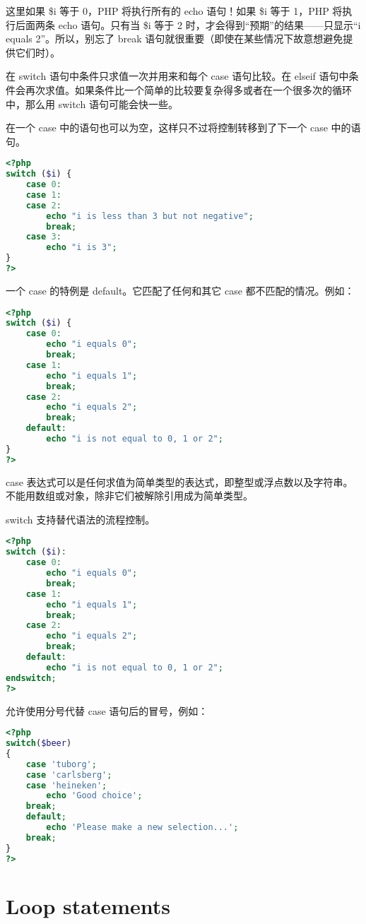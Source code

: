 这里如果 \$i 等于 0，PHP 将执行所有的 echo 语句！如果 \$i 等于 1，PHP 将执行后面两条 echo 语句。只有当 \$i 等于 2 时，才会得到“预期”的结果——只显示“i equals 2”。所以，别忘了 break 语句就很重要（即使在某些情况下故意想避免提供它们时）。

在 switch 语句中条件只求值一次并用来和每个 case 语句比较。在 elseif 语句中条件会再次求值。如果条件比一个简单的比较要复杂得多或者在一个很多次的循环中，那么用 switch 语句可能会快一些。

在一个 case 中的语句也可以为空，这样只不过将控制转移到了下一个 case 中的语句。

\begin{lstlisting}[language=PHP]
<?php
switch ($i) {
    case 0:
    case 1:
    case 2:
        echo "i is less than 3 but not negative";
        break;
    case 3:
        echo "i is 3";
}
?>
\end{lstlisting}


一个 case 的特例是 default。它匹配了任何和其它 case 都不匹配的情况。例如：

\begin{lstlisting}[language=PHP]
<?php
switch ($i) {
    case 0:
        echo "i equals 0";
        break;
    case 1:
        echo "i equals 1";
        break;
    case 2:
        echo "i equals 2";
        break;
    default:
        echo "i is not equal to 0, 1 or 2";
}
?>
\end{lstlisting}


case 表达式可以是任何求值为简单类型的表达式，即整型或浮点数以及字符串。不能用数组或对象，除非它们被解除引用成为简单类型。

switch 支持替代语法的流程控制。

\begin{lstlisting}[language=PHP]
<?php
switch ($i):
    case 0:
        echo "i equals 0";
        break;
    case 1:
        echo "i equals 1";
        break;
    case 2:
        echo "i equals 2";
        break;
    default:
        echo "i is not equal to 0, 1 or 2";
endswitch;
?>
\end{lstlisting}


允许使用分号代替 case 语句后的冒号，例如：

\begin{lstlisting}[language=PHP]
<?php
switch($beer)
{
    case 'tuborg';
    case 'carlsberg';
    case 'heineken';
        echo 'Good choice';
    break;
    default;
        echo 'Please make a new selection...';
    break;
}
?>
\end{lstlisting}

\section{Loop statements}



